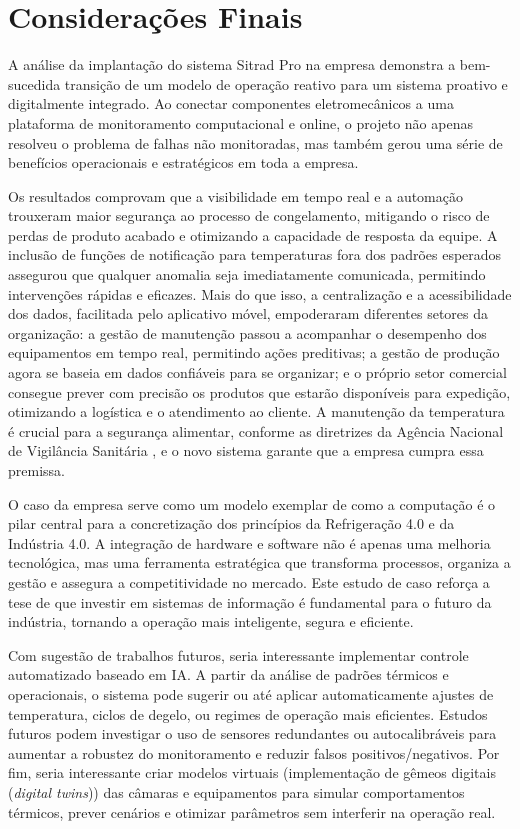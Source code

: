 \documentclass[12pt]{article}
\begin{document}
\section{Considerações Finais} \label{sec:conclusao}
A análise da implantação do sistema Sitrad Pro na empresa demonstra a bem-sucedida transição de um modelo de operação reativo para um sistema proativo e digitalmente integrado. Ao conectar componentes eletromecânicos a uma plataforma de monitoramento computacional e online, o projeto não apenas resolveu o problema de falhas não monitoradas, mas também gerou uma série de benefícios operacionais e estratégicos em toda a empresa.

Os resultados comprovam que a visibilidade em tempo real e a automação trouxeram maior segurança ao processo de congelamento, mitigando o risco de perdas de produto acabado e otimizando a capacidade de resposta da equipe. A inclusão de funções de notificação para temperaturas fora dos padrões esperados assegurou que qualquer anomalia seja imediatamente comunicada, permitindo intervenções rápidas e eficazes. Mais do que isso, a centralização e a acessibilidade dos dados, facilitada pelo aplicativo móvel, empoderaram diferentes setores da organização: a gestão de manutenção passou a acompanhar o desempenho dos equipamentos em tempo real, permitindo ações preditivas; a gestão de produção agora se baseia em dados confiáveis para se organizar; e o próprio setor comercial consegue prever com precisão os produtos que estarão disponíveis para expedição, otimizando a logística e o atendimento ao cliente. A manutenção da temperatura é crucial para a segurança alimentar, conforme as diretrizes da Agência Nacional de Vigilância Sanitária \cite{anvisa2004}, e o novo sistema garante que a empresa cumpra essa premissa.

O caso da empresa serve como um modelo exemplar de como a computação é o pilar central para a concretização dos princípios da Refrigeração 4.0 e da Indústria 4.0. A integração de hardware e software não é apenas uma melhoria tecnológica, mas uma ferramenta estratégica que transforma processos, organiza a gestão e assegura a competitividade no mercado. Este estudo de caso reforça a tese de que investir em sistemas de informação é fundamental para o futuro da indústria, tornando a operação mais inteligente, segura e eficiente.

Com sugestão de trabalhos futuros, seria interessante implementar controle automatizado baseado em IA. A partir da análise de padrões térmicos e operacionais, o sistema pode sugerir ou até aplicar automaticamente ajustes de temperatura, ciclos de degelo, ou regimes de operação mais eficientes. Estudos futuros podem investigar o uso de sensores redundantes ou autocalibráveis para aumentar a robustez do monitoramento e reduzir falsos positivos/negativos. Por fim, seria interessante criar modelos virtuais (implementação de gêmeos digitais (\textit{digital twins})) das câmaras e equipamentos para simular comportamentos térmicos, prever cenários e otimizar parâmetros sem interferir na operação real.
\end{document}
